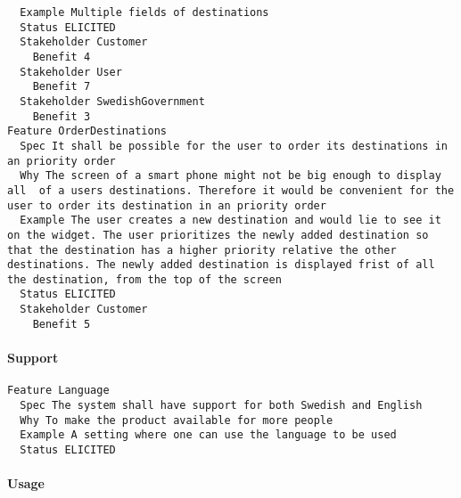 \begin{lstlisting}
  Example Multiple fields of destinations
  Status ELICITED
  Stakeholder Customer
    Benefit 4
  Stakeholder User
    Benefit 7
  Stakeholder SwedishGovernment
    Benefit 3
Feature OrderDestinations
  Spec It shall be possible for the user to order its destinations in an priority order
  Why The screen of a smart phone might not be big enough to display all  of a users destinations. Therefore it would be convenient for the user to order its destination in an priority order
  Example The user creates a new destination and would lie to see it on the widget. The user prioritizes the newly added destination so that the destination has a higher priority relative the other destinations. The newly added destination is displayed frist of all the destination, from the top of the screen
  Status ELICITED
  Stakeholder Customer
    Benefit 5

\end{lstlisting}
    
        
       \paragraph{Support}


\begin{lstlisting}
Feature Language
  Spec The system shall have support for both Swedish and English
  Why To make the product available for more people
  Example A setting where one can use the language to be used
  Status ELICITED

\end{lstlisting}
    
        
       \paragraph{Usage}


